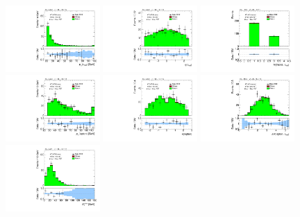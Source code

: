\begin{figure}[tp]
  \centering
  \includegraphics[width=0.32\textwidth]{figures/analysis/vbf-ZllCR/tau-pt}
  \includegraphics[width=0.32\textwidth]{figures/analysis/vbf-ZllCR/tau-eta}
  \includegraphics[width=0.32\textwidth]{figures/analysis/vbf-ZllCR/tau-numTrack}
  \includegraphics[width=0.32\textwidth]{figures/analysis/vbf-ZllCR/lep-pt-hi}
  \includegraphics[width=0.32\textwidth]{figures/analysis/vbf-ZllCR/lep-eta}
  \includegraphics[width=0.32\textwidth]{figures/analysis/vbf-ZllCR/taulep-dR}
  \includegraphics[width=0.32\textwidth]{figures/analysis/vbf-ZllCR/met-pt-hi}

\end{figure}
